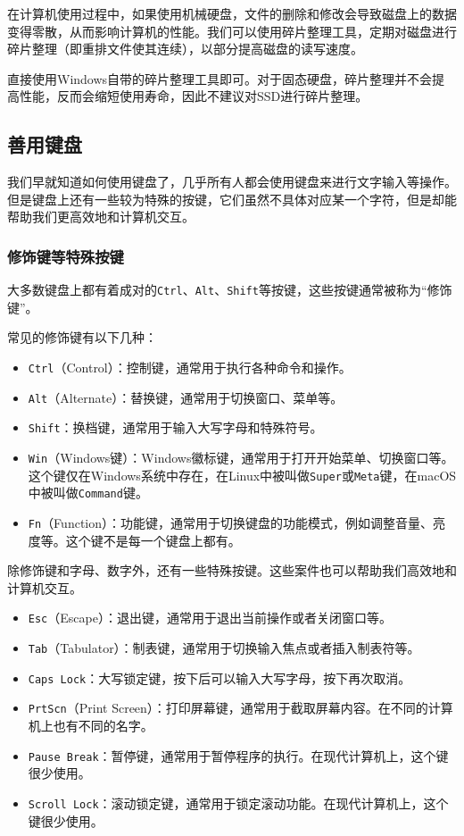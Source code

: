在计算机使用过程中，如果使用机械硬盘，文件的删除和修改会导致磁盘上的数据变得零散，从而影响计算机的性能。我们可以使用碎片整理工具，定期对磁盘进行碎片整理（即重排文件使其连续），以部分提高磁盘的读写速度。

直接使用Windows自带的碎片整理工具即可。对于固态硬盘，碎片整理并不会提高性能，反而会缩短使用寿命，因此不建议对SSD进行碎片整理。

\subsection{善用键盘}

我们早就知道如何使用键盘了，几乎所有人都会使用键盘来进行文字输入等操作。但是键盘上还有一些较为特殊的按键，它们虽然不具体对应某一个字符，但是却能帮助我们更高效地和计算机交互。

\subsubsection{修饰键等特殊按键}

大多数键盘上都有着成对的\texttt{Ctrl}、\texttt{Alt}、\texttt{Shift}等按键，这些按键通常被称为“修饰键”。

常见的修饰键有以下几种：
\begin{itemize}
  \item \texttt{Ctrl}（Control）：控制键，通常用于执行各种命令和操作。
  \item \texttt{Alt}（Alternate）：替换键，通常用于切换窗口、菜单等。
  \item \texttt{Shift}：换档键，通常用于输入大写字母和特殊符号。
  \item \texttt{Win}（Windows键）：Windows徽标键，通常用于打开开始菜单、切换窗口等。这个键仅在Windows系统中存在，在Linux中被叫做\texttt{Super}或\texttt{Meta}键，在macOS中被叫做\texttt{Command}键。
  \item \texttt{Fn}（Function）：功能键，通常用于切换键盘的功能模式，例如调整音量、亮度等。这个键不是每一个键盘上都有。
\end{itemize}

除修饰键和字母、数字外，还有一些特殊按键。这些案件也可以帮助我们高效地和计算机交互。
\begin{itemize}
  \item \texttt{Esc}（Escape）：退出键，通常用于退出当前操作或者关闭窗口等。
  \item \texttt{Tab}（Tabulator）：制表键，通常用于切换输入焦点或者插入制表符等。
  \item \texttt{Caps Lock}：大写锁定键，按下后可以输入大写字母，按下再次取消。
  \item \texttt{PrtScn}（Print Screen）：打印屏幕键，通常用于截取屏幕内容。在不同的计算机上也有不同的名字。
  \item \texttt{Pause Break}：暂停键，通常用于暂停程序的执行。在现代计算机上，这个键很少使用。
  \item \texttt{Scroll Lock}：滚动锁定键，通常用于锁定滚动功能。在现代计算机上，这个键很少使用。
\end{itemize}

